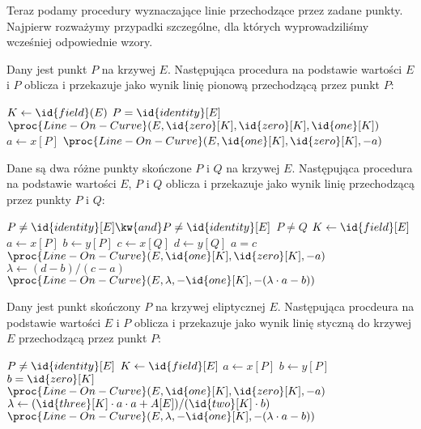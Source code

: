 \noindent
Teraz podamy procedury wyznaczające linie przechodzące przez zadane punkty.
Najpierw rozważymy przypadki szczególne,
dla których wyprowadziliśmy wcześniej odpowiednie wzory.

\begin{algorithm}
Dany jest punkt $P$ na krzywej $E$.
Następująca procedura
na podstawie wartości $E$ i $P$
oblicza i przekazuje jako wynik
linię pionową przechodzącą przez punkt $P$:

\begin{codebox}
\li $K \gets \id{field}(E)$
\li \If $P = \id{identity}[E]$
\li     \Then
            \Return $\proc{Line-On-Curve}(E, \id{zero}[K], \id{zero}[K], \id{one}[K])$
\li     \Else
            $a \gets x[P]$
\li         \Return $\proc{Line-On-Curve}(E, \id{one}[K], \id{zero}[K], -a)$
        \End
\end{codebox}
\end{algorithm}

\begin{algorithm}
Dane są dwa różne punkty skończone $P$ i $Q$ na krzywej $E$.
Następująca procedura
na podstawie wartości $E$, $P$ i $Q$
oblicza i przekazuje jako wynik
linię przechodzącą przez punkty $P$ i $Q$:

\begin{codebox}
\li \Assert $P \neq \id{identity}[E] \kw{ and } P \neq \id{identity}[E]$
\li \Assert $P \neq Q$
\li $K \gets \id{field}[E]$
\li $a \gets x[P]$
\li $b \gets y[P]$
\li $c \gets x[Q]$
\li $d \gets y[Q]$
\li \If $a = c$
\li     \Then
            \Return $\proc{Line-On-Curve}(E, \id{one}[K], \id{zero}[K], -a)$
\li     \Else
            $\lambda \gets (d-b)/(c-a)$
\li         \Return $\proc{Line-On-Curve}(E, \lambda, -\id{one}[K], -(\lambda\cdot a - b))$
        \End
\end{codebox}
\end{algorithm}

\begin{algorithm}
Dany jest punkt skończony $P$ na krzywej eliptycznej $E$.
Następująca procdeura
na podstawie wartości $E$ i $P$
oblicza i przekazuje jako wynik
linię styczną do krzywej $E$ przechodzącą przez punkt $P$:

\begin{codebox}
\li \Assert $P \neq \id{identity}[E]$
\li $K \gets \id{field}[E]$
\li $a \gets x[P]$
\li $b \gets y[P]$
\li \If $b = \id{zero}[K]$
\li     \Then
            \Return $\proc{Line-On-Curve}(E, \id{one}[K], \id{zero}[K], -a)$
\li     \Else
            $\lambda \gets (\id{three}[K]\cdot a \cdot a + A[E])/(\id{two}[K]\cdot b)$
\li         \Return $\proc{Line-On-Curve}(E, \lambda, -\id{one}[K], -(\lambda\cdot a - b))$
        \End
\end{codebox}
\end{algorithm}

